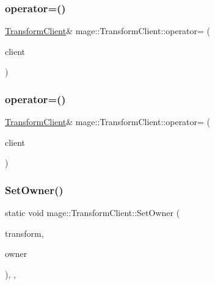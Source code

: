 \subsubsection{\texorpdfstring{operator=()}{operator=()}\hspace{0.1cm}{\footnotesize\ttfamily [1/2]}}
{\footnotesize\ttfamily \hyperlink{classmage_1_1_transform_client}{Transform\+Client}\& mage\+::\+Transform\+Client\+::operator= (\begin{DoxyParamCaption}\item[{const \hyperlink{classmage_1_1_transform_client}{Transform\+Client} \&}]{client }\end{DoxyParamCaption})\hspace{0.3cm}{\ttfamily [delete]}}

\hypertarget{classmage_1_1_transform_client_aace10c91a28d9441776334431a6106d7}{}\label{classmage_1_1_transform_client_aace10c91a28d9441776334431a6106d7} 
\subsubsection{\texorpdfstring{operator=()}{operator=()}\hspace{0.1cm}{\footnotesize\ttfamily [2/2]}}
{\footnotesize\ttfamily \hyperlink{classmage_1_1_transform_client}{Transform\+Client}\& mage\+::\+Transform\+Client\+::operator= (\begin{DoxyParamCaption}\item[{\hyperlink{classmage_1_1_transform_client}{Transform\+Client} \&\&}]{client }\end{DoxyParamCaption})\hspace{0.3cm}{\ttfamily [delete]}}

\hypertarget{classmage_1_1_transform_client_a2aa5a5d9d95b161f6673409cc11e1e1c}{}\label{classmage_1_1_transform_client_a2aa5a5d9d95b161f6673409cc11e1e1c} 
\subsubsection{\texorpdfstring{Set\+Owner()}{SetOwner()}}
{\footnotesize\ttfamily static void mage\+::\+Transform\+Client\+::\+Set\+Owner (\begin{DoxyParamCaption}\item[{\hyperlink{classmage_1_1_transform}{Transform} \&}]{transform,  }\item[{\hyperlink{classmage_1_1_proxy_ptr}{Proxy\+Ptr}$<$ \hyperlink{classmage_1_1_node}{Node} $>$}]{owner }\end{DoxyParamCaption})\hspace{0.3cm}{\ttfamily [static]}, {\ttfamily [private]}, {\ttfamily [noexcept]}}

